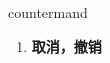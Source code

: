 
\begin{frame}
{\huge countermand}
\begin{center}
\begin{enumerate}\Large
  \item \textbf{取消，撤销}
\end{enumerate}
\end{center}
\end{frame}

